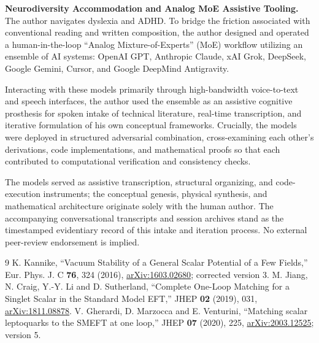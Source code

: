 \documentclass[11pt]{article}
\begin{document}
\vspace{0.5em}
\noindent\textbf{Neurodiversity Accommodation and Analog MoE Assistive Tooling.}
The author navigates dyslexia and ADHD. To bridge the friction associated with conventional reading and written composition, the author designed and operated a human-in-the-loop ``Analog Mixture-of-Experts'' (MoE) workflow utilizing an ensemble of AI systems: OpenAI GPT, Anthropic Claude, xAI Grok, DeepSeek, Google Gemini, Cursor, and Google DeepMind Antigravity.

Interacting with these models primarily through high-bandwidth voice-to-text and speech interfaces, the author used the ensemble as an assistive cognitive prosthesis for spoken intake of technical literature, real-time transcription, and iterative formulation of his own conceptual frameworks. Crucially, the models were deployed in structured adversarial combination, cross-examining each other's derivations, code implementations, and mathematical proofs so that each contributed to computational verification and consistency checks.

The models served as assistive transcription, structural organizing, and code-execution instruments; the conceptual genesis, physical synthesis, and mathematical architecture originate solely with the human author. The accompanying conversational transcripts and session archives stand as the timestamped evidentiary record of this intake and iteration process. No external peer-review endorsement is implied.

\begin{thebibliography}{9}
 K. Kannike, ``Vacuum Stability of a General Scalar Potential
of a Few Fields,'' Eur. Phys. J. C \textbf{76}, 324 (2016),
\href{https://arxiv.org/abs/1603.02680}{arXiv:1603.02680}; corrected version 3.
 M. Jiang, N. Craig, Y.-Y. Li and D. Sutherland,
``Complete One-Loop Matching for a Singlet Scalar in the Standard Model EFT,''
JHEP \textbf{02} (2019), 031,
\href{https://arxiv.org/abs/1811.08878}{arXiv:1811.08878}.
 V. Gherardi, D. Marzocca and E. Venturini,
``Matching scalar leptoquarks to the SMEFT at one loop,''
JHEP \textbf{07} (2020), 225,
\href{https://arxiv.org/abs/2003.12525}{arXiv:2003.12525}; version 5.
\end{thebibliography}
\end{document}
